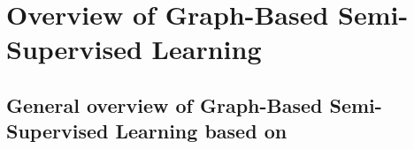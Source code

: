 \documentclass[10pt, letterpaper]{article}
\begin{document}
\section{Overview of Graph-Based Semi-Supervised Learning}
\subsection{General overview of Graph-Based Semi-Supervised Learning based on }


\newpage
\nocite{*}
\printbibliography[heading=bibintoc,title={Bibliography}]
\end{document}
